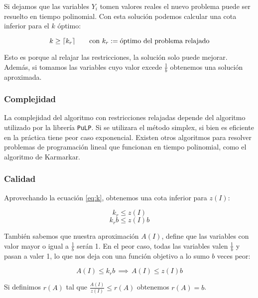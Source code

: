 Si dejamos que las variables $Y_i$ tomen valores reales el nuevo problema puede
ser resuelto en tiempo polinomial. Con esta soluci\'on podemos calcular una
cota inferior para el $k$ \'optimo:

\begin{equation}
    \label{eq:k}
    k \ge \lceil k_r\rceil \qquad \text{con} \ k_r := \text{\'optimo del problema
    relajado}
\end{equation}

Esto es porque al relajar las restricciones, la soluci\'on solo puede mejorar.
Adem\'as, si tomamos las variables cuyo valor excede $\frac{1}{b}$ obtenemos
una soluci\'on aproximada.

\subsubsection{Complejidad}

La complejidad del algoritmo con restricciones relajadas depende del algoritmo
utilizado por la librer\'ia \texttt{PuLP}. Si se utilizara el m\'etodo simplex,
si bien es eficiente en la pr\'actica tiene peor caso exponencial. Existen
otros algoritmos para resolver problemas de programaci\'on lineal que funcionan
en tiempo polinomial, como el algoritmo de Karmarkar.

\subsubsection{Calidad}

Aprovechando la ecuaci\'on \eqref{eq:k}, obtenemos una cota inferior para
$z(I)$:

\begin{equation*}
    k_r \le z(I)
\end{equation*}
\begin{equation*}
    k_r b \le z(I) b
\end{equation*}

Tambi\'en sabemos que nuestra aproximaci\'on $A(I)$, define que las variables
con valor mayor o igual a $\frac{1}{b}$ ser\'an 1. En el peor caso, todas las
variables valen $\frac{1}{b}$ y pasan a valer 1, lo que nos deja con una
funci\'on objetivo a lo sumo $b$ veces peor:

\begin{equation*}
    A(I) \le k_r b \, \implies \, A(I) \le z(I) b
\end{equation*}

Si definimos $r(A)$ tal que $\frac{A(I)}{z(I)} \le r(A)$ obtenemos $r(A) = b$.
